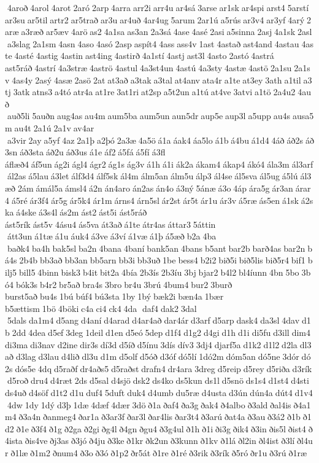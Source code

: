  4aroð 4arol 4arot 2aró 2arp 4arra arr2i arr4u ar4sá 3arse ar1sk ar4spi arst4 5arstí ar3su ar5til artr2 ar5trað ar3u ar4uð 4ar4ug 5arum 2ar1ú a5rús ar3v4 ar3yf 4arý 2aræ a3ræð ar5æv 4arö as2 4a1sa as3an 2a3sá 4ase 4asé 2asi a5sinna 2asj 4a1sk 2asl a3slag 2a1sm 4asn 4aso 4asó 2asp aspít4 4ass ass4v 1ast 4astað ast4and 4astau 4aste 4asté 4astig 4astin ast4ing 4astirð 4a1stí 4astj ast3l 4asto 2astó 4astrá 	ast5ráð 4astrí 4a3stræ 4aströ 4astul 4a3st4un 4astú 4a3sty 4astæ 4astö 2a1su 2a1sv 4as4y 2asý 4asæ 2asö 2at at3að a3tak a3tal at4anv ata4r a1te at3ey 3ath a1til a3tj 3atk atns3 a4tó atr4a at1re 3at1ri at2sp a5t2un a1tú at4ve 3atvi a1tö 2a4u2 4auð  auð5li 5auðn aug4as au4m aum5ba aum5un aun5dr aup5e aup3l a5upp au4s ausa5m au4t 2a1ú 2a1v av4ar  a3vir 2ay a5yf 4az 2a1þ a2þó 2a3æ 4a5ö á1a áak4 áa5lo á1b á4bu á1d4 4áð áð2s áð3sn áð3sta áð2u áð3us á1e áf2 á5fá á5fí á3fl 	áflæð4 áf5un ág2i ágl4 ágr2 ág1s ág3v á1h á1i ák2a ákam4 ákap4 ákó4 ála3m ál3arf ál2as á5lau á3let álf3d4 álf5sk ál4m álm5an álm5u álp3 ál4se ál5sva ál5ug á5lú ál3æð 2ám ámál5a ámsl4 á2n án4aro án2as án4o á3ný 5ánæ á3o 4áp ára5g ár3an árar4 á5ré ár3f4 ár5g ár5k4 ár1m árns4 árn5sl ár2st ár5t ár1u ár3v á5ræ ás5en á1sk á2ska á4ske á3s4l ás2m ást2 ást5i 
ást5ráð 	ást5rík ást5v 4ásu4 ás5va át3að á1te átr4as áttar3 5áttin  átt3un á1tæ á1u áuk4 á3ve á3ví á1væ á1þ á5æð b2a 4ba  baðk4 ba4h bak5sl ba2n 4bana 4baní bank5an 4bans b5ant bar2b barð4as bar2n bá4s 2b4b bb3að bb3an bb5arn bb3i bb3uð 1be bess4 b2i2 bið5i bið5lis bið5r4 bif1 bilj5 bill5 4binn bisk3 b4it bit2a 4bía 2b3ís 2b3íu 3bj bjar2 b4l2 bl4íunn 4bn 5bo 3bó4 bók3s b4r2 br5að bra4s 3bro br4u 3brú 4bum4 bur2 3burð 	burst5að bu4s 1bú búf4 bú3sta 1by 1bý bæk2i bæn4a 1bær 	b5ættism 1bö 4böki c4a ci4 ck4 4da  daf4 dak2 3dal  5dals da1m4 d5ang d4aní d4arad d4ar4að dar4ár d3arf d5arp dask4 da3sl 4dav d1b 2dd 4dea d5ef 3deg 1deil d1en d5eó 5dep d1f4 d1g2 d4gi d1h d1i di5fu d3ill dim4 di3ma di3nav d2ine dir3s dí3d d5íð d5ínu 3dís dív3 3dj4 djarf5a d1k2 d1l2 d2la dl3að d3lag d3lau d4lið dl3u d1m d5olf d5óð d3óf dó5lí 1dó2m dóm5an dó5ne 3dór dó2s dós5e 4dq d5raðf dr4aðs5 d5raðst drafn4 dr4ara 3dreg d5reip d5rey d5riða d3rík d5roð dru4 d4ræt 2ds d5sal d4sjö dsk2 ds4ko ds5kun ds1l d5snö ds1s4 d1st4 d4sti ds4uð d4söf d1t2 d1u duf4 5duft duk4 d4umb du5ræ d4usta d3ún dún4a dút4 d1v4 4dw 1dy 1dý d3þ 1dæ 4dæf 4dær 3dö ð1a ðaf4 ða3g ðak4 ð4albo ð3ald ðal4is ð4a1m4 ð3a4n ðanmeg4 ðar1a ð3ar3f ðar3l ðar4lis ðar3t4 ð3arú ðat4a ð3au ð3á2 ð1b ð1d2 ð1e ð3f4 ð1g ð2ga ð2gi ðg4l ð4gn ðgu4 ð3g4ul ð1h ð1i ði3g ðik4 ð3in ðis5l ðist4 ð4ista ðis4ve ðj3as ð3jó ð4ju ð3ke ð1kr ðk2un ð3kunn ð1kv ð1lá ðl2in ðl4ist ð3lí ðl4ur ð1læ ð1m2 ðnum4 ð3o ð3ó ð1p2 ðr5át ð1re ð1ré ð3rik ð3rík ð5ró ðr1u ð3rú ð1ræ 
